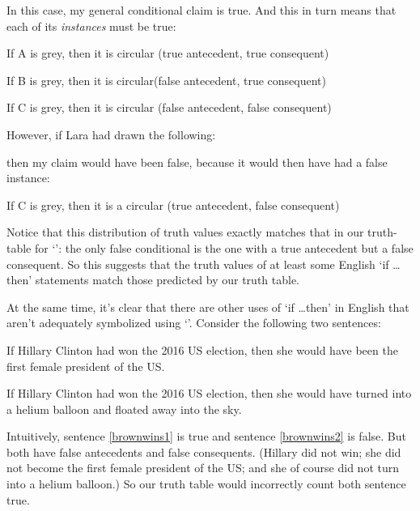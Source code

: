 \begin{center}
\end{center}
In this case, my general conditional claim is true.  And this in turn means that each of its \emph{instances} must be true:
	\begin{ebullet}
		\item If A is grey, then it is circular \hfill (true antecedent, true consequent)
		\item If B is grey, then it is circular\hfill (false antecedent, true consequent)
		\item If C is grey, then it is circular \hfill (false antecedent, false consequent)
	\end{ebullet}
However, if Lara had drawn the following:
\begin{center}
\end{center}
then my claim would have been false, because it would then have had a false instance:
	\begin{ebullet}
		\item If C is grey, then it is a circular \hfill (true antecedent, false consequent)
	\end{ebullet}
Notice that this distribution of truth values exactly matches that in our truth-table for `\eif': the only false conditional is the one with a true antecedent but a false consequent. So this suggests that the truth values of at least some English `if \ldots then' statements match those predicted by our truth table.

At the same time, it's clear that there are other uses of `if \ldots then' in English that aren't adequately symbolized using `\eif'.  Consider the following two sentences:
	\begin{earg}
		\item[\ex{brownwins1}] If Hillary Clinton had won the 2016 US election, then she would have been the first female president of the US.
		\item[\ex{brownwins2}] If Hillary Clinton had won the 2016 US election, then she would have turned into a helium balloon and floated away into the sky.
	\end{earg}
Intuitively, sentence \ref{brownwins1} is true and sentence \ref{brownwins2} is false. But both have false antecedents and false consequents. (Hillary did not win; she did not become the first female president of the US; and she of course did not turn into a helium balloon.)  So our truth table would incorrectly count both sentence true.


